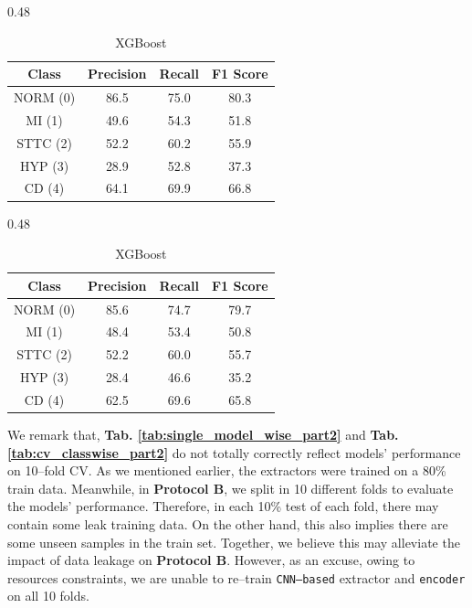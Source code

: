 \begin{table}[H]
    \begin{subtable}[t]{0.48\textwidth}
        \centering
        \caption{CatBoost}
        \label{tab:cv_cat_part2}
        \begin{tabular}{cccc}
            \toprule
            Class & Precision & Recall & F1 Score \\
            \midrule
            NORM (0) & 86.5 & 75.0 & 80.3 \\
            MI   (1) & 49.6 & 54.3 & 51.8 \\
            STTC (2) & 52.2 & 60.2 & 55.9 \\
            HYP  (3) & 28.9 & 52.8 & 37.3 \\
            CD   (4) & 64.1 & 69.9 & 66.8 \\
            \bottomrule
        \end{tabular}
    \end{subtable}
    \hfill
    \begin{subtable}[t]{0.48\textwidth}
        \centering
        \caption{XGBoost}
        \label{tab:cv_xgb_part2}
        \begin{tabular}{cccc}
            \toprule
            Class & Precision & Recall & F1 Score \\
            \midrule
            NORM (0) & 85.6 & 74.7 & 79.7 \\
            MI   (1) & 48.4 & 53.4 & 50.8 \\
            STTC (2) & 52.2 & 60.0 & 55.7 \\
            HYP  (3) & 28.4 & 46.6 & 35.2 \\
            CD   (4) & 62.5 & 69.6 & 65.8 \\
            \bottomrule
        \end{tabular}
    \end{subtable}
\end{table}

We remark that, \textbf{Tab. \ref{tab:single_model_wise_part2}} and \textbf{Tab. \ref{tab:cv_classwise_part2}} do not totally correctly reflect models' performance on 10–fold CV.
As we mentioned earlier, the extractors were trained on a 80\% train data. Meanwhile, in \textbf{Protocol B}, we split in 10 different folds to evaluate the models' performance.
Therefore, in each 10\% test of each fold, there may contain some leak training data. On the other hand, this also implies there are some unseen samples in the train set.
Together, we believe this may alleviate the impact of data leakage on \textbf{Protocol B}.
However, as an excuse, owing to resources constraints, we are unable to re–train \texttt{CNN–based} extractor and \texttt{encoder} on all 10 folds.

